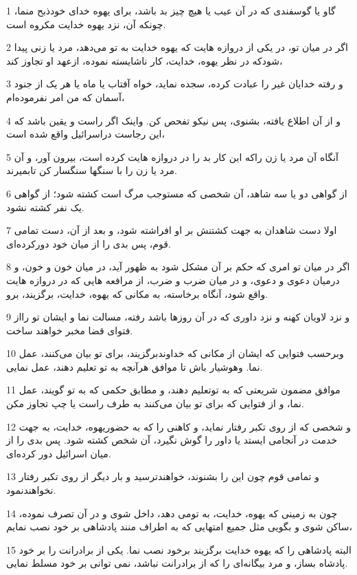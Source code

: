 \par 1 گاو یا گوسفندی که در آن عیب یا هیچ چیز بد باشد، برای یهوه خدای خودذبح منما، چونکه آن، نزد یهوه خدایت مکروه است.
\par 2 اگر در میان تو، در یکی از دروازه هایت که یهوه خدایت به تو می‌دهد، مرد یا زنی پیدا شودکه در نظر یهوه، خدایت، کار ناشایسته نموده، ازعهد او تجاوز کند،
\par 3 و رفته خدایان غیر را عبادت کرده، سجده نماید، خواه آفتاب یا ماه یا هر یک از جنود آسمان که من امر نفرموده‌ام،
\par 4 و از آن اطلاع یافته، بشنوی، پس نیکو تفحص کن. واینک اگر راست و یقین باشد که این رجاست دراسرائیل واقع شده است،
\par 5 آنگاه آن مرد یا زن راکه این کار بد را در دروازه هایت کرده است، بیرون آور، و آن مرد یا زن را با سنگها سنگسار کن تابمیرند.
\par 6 از گواهی دو یا سه شاهد، آن شخصی که مستوجب مرگ است کشته شود؛ از گواهی یک نفر کشته نشود.
\par 7 اولا دست شاهدان به جهت کشتنش بر او افراشته شود، و بعد از آن، دست تمامی قوم، پس بدی را از میان خود دورکرده‌ای.
\par 8 اگر در میان تو امری که حکم بر آن مشکل شود به ظهور آید، در میان خون و خون، و درمیان دعوی و دعوی، و در میان ضرب و ضرب، از مرافعه هایی که در دروازه هایت واقع شود، آنگاه برخاسته، به مکانی که یهوه، خدایت، برگزیند، برو.
\par 9 و نزد لاویان کهنه و نزد داوری که در آن روزها باشد رفته، مسالت نما و ایشان تو رااز فتوای قضا مخبر خواهند ساخت.
\par 10 وبرحسب فتوایی که ایشان از مکانی که خداوندبرگزیند، برای تو بیان می‌کنند، عمل نما. وهوشیار باش تا موافق هر‌آنچه به تو تعلیم دهند، عمل نمایی.
\par 11 موافق مضمون شریعتی که به توتعلیم دهند، و مطابق حکمی که به تو گویند، عمل نما، و از فتوایی که برای تو بیان می‌کنند به طرف راست یا چپ تجاوز مکن.
\par 12 و شخصی که از روی تکبر رفتار نماید، و کاهنی را که به حضوریهوه، خدایت، به جهت خدمت در آنجامی ایستد یا داور را گوش نگیرد، آن شخص کشته شود. پس بدی را از میان اسرائیل دور کرده‌ای.
\par 13 و تمامی قوم چون این را بشنوند، خواهندترسید و بار دیگر از روی تکبر رفتار نخواهندنمود.
\par 14 چون به زمینی که یهوه، خدایت، به تومی دهد، داخل شوی و در آن تصرف نموده، ساکن شوی و بگویی مثل جمیع امتهایی که به اطراف منند پادشاهی بر خود نصب نمایم،
\par 15 البته پادشاهی را که یهوه خدایت برگزیند برخود نصب نما. یکی از برادرانت را بر خود پادشاه بساز، و مرد بیگانه‌ای را که از برادرانت نباشد، نمی توانی بر خود مسلط نمایی.
